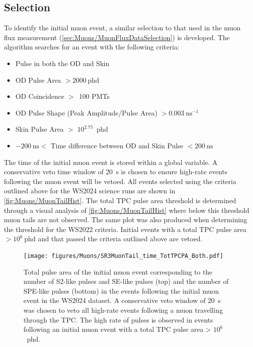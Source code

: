 \subsection{Selection}\label{sec:Muons/MuonVetoCutDesc}
To identify the initial muon event, a similar selection to that used in the muon flux measurement (\autoref{sec:Muons/MuonFluxDataSelection}) is developed. The algorithm searches for an event with the following criteria:
\begin{itemize}
    \item Pulse in both the OD and Skin
    \item OD Pulse Area $>2000~\text{phd}$
    \item OD Coincidence $>$~100 PMTs
    \item OD Pulse Shape (Peak Amplitude/Pulse Area) $>0.003~\text{ns}^{-1}$
    \item Skin Pulse Area $>$ $10^{2.75}$~phd
    \item $-200~\text{ns}<$ Time difference between OD and Skin Pulse $< 200~\text{ns}$
\end{itemize}

The time of the initial muon event is stored within a global variable. A conservative veto time window of 20~s is chosen to ensure high-rate events following the muon event will be vetoed. All events selected using the criteria outlined above for the WS2024 science runs are shown in \autoref{fig:Muons/MuonTailHist}. The total TPC pulse area threshold is determined through a visual analysis of \autoref{fig:Muons/MuonTailHist} where below this threshold muon tails are not observed. The same plot was also produced when determining the threshold for the WS2022 criteria. Initial events with a total TPC pulse area $>10^{6}~\text{phd}$ and that passed the criteria outlined above are vetoed.

\begin{figure}
    \centering
    \texttt{[image: figures/Muons/SR3MuonTail\_time\_TotTPCPA\_Both.pdf]}
    \caption[Total pulse area of the initial muon event corresponding to the number of S2-like pulses and SE-like pulses and the number of SPE-like pulses in the events following the initial muon event.]{Total pulse area of the initial muon event corresponding to the number of S2-like pulses and SE-like pulses (top) and the number of SPE-like pulses (bottom) in the events following the initial muon event in the WS2024 dataset. A conservative veto window of 20~s was chosen to veto all high-rate events following a muon travelling through the TPC. The high rate of pulses is observed in events following an initial muon event with a total TPC pulse area > $10^{6}$~phd.}
    \label{fig:Muons/MuonTailHist}
\end{figure}


